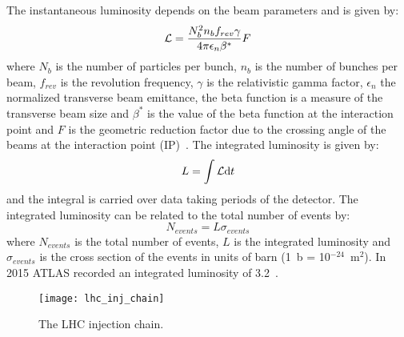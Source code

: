 The instantaneous luminosity depends on the beam parameters and is given by:
\begin{equation}
  \label{eq:54}
  \mathcal{L} = \frac{N^2_b n_b f_{rev} \gamma}{4 \pi \epsilon_n \beta^*} F
\end{equation}
where $N_b$ is the number of particles per bunch, $n_b$ is the number of bunches
per beam, $f_{rev}$ is the revolution frequency, $\gamma$ is the relativistic
gamma factor, $\epsilon_n$ the normalized transverse beam emittance, the beta
function is a measure of the transverse beam size and $\beta^*$ is the value of
the beta function at the interaction point and $F$ is the geometric reduction
factor due to the crossing angle of the beams at the interaction point
(IP)~\cite{LHC}. The integrated luminosity is given by:
\begin{equation}
  \label{eq:55}
  L = \int \mathcal{L} \mathrm{d} t
\end{equation}
and the integral is carried over data taking periods of the detector. The
integrated luminosity can be related to the total number of events by:
\begin{equation}
  \label{eq:56}
  N_{events} = L \sigma_{events}
\end{equation}
where $N_{events}$ is the total number of events, $L$ is the integrated
luminosity and $\sigma_{events}$ is the cross section of the events in units of
barn (1~b = 10$^{-24}$~m$^2$). In 2015 ATLAS recorded an integrated luminosity
of 3.2~\ifb.

\begin{figure}[!h]
  \centering
    \texttt{[image: lhc\_inj\_chain]}
    \caption{The LHC injection chain.}
    \label{fig:lhc_inj_chain}
\end{figure}
